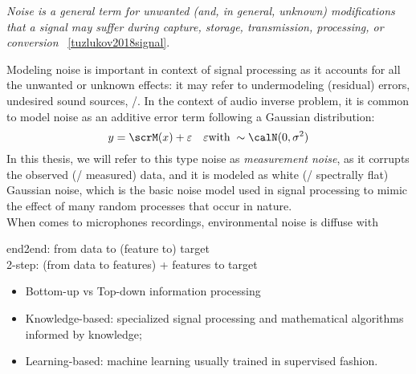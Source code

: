 \begin{center}
    \textit{\emph{Noise} is a general term for unwanted (and, in general, unknown) modifications that a signal may suffer during capture, storage, transmission, processing, or conversion}
    ~\cref{tuzlukov2018signal}.
\end{center}
Modeling noise is important in context of signal processing as it accounts for all the unwanted or unknown effects:
it may refer to undermodeling (residual) errors, undesired sound sources, \etc/.
In the context of audio inverse problem, it is common to model noise as an additive error term following a Gaussian distribution:
\begin{equation}\label{eq:processing:model}
    y = \scrM(x) + \error \mathspace \error \text{with} \; \sim \calN(0, \sigma^2)
\end{equation}
In this thesis, we will refer to this type noise as \textit{measurement noise}, as it corrupts the observed (\ie/ measured) data,
and it is modeled as white (\ie/ spectrally flat) Gaussian noise, which is the basic noise model used in signal processing to mimic the effect of many random processes that occur in nature.
\\When comes to microphones recordings, environmental noise is diffuse with




end2end: from data to (feature to) target
\\2-step: (from data to features) + features to target

\begin{itemize}
    \item Bottom-up vs Top-down information processing
    \item Knowledge-based: specialized signal processing and mathematical algorithms informed by knowledge;
    \item Learning-based: machine learning usually trained in supervised fashion.
\end{itemize}

